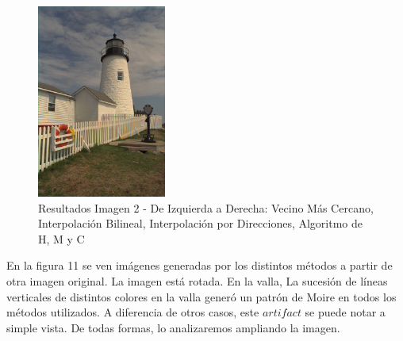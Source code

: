 \documentclass[a4paper]{article}
\begin{document}
\begin{figure}[h!]
\includegraphics[width=120pt]{img/img8-3.png}
\caption{Resultados Imagen 2 - De Izquierda a Derecha: Vecino Más Cercano, Interpolación Bilineal, Interpolación por Direcciones,  Algoritmo de H, M y C}
\end{figure}

En la figura 11 se ven imágenes generadas por los distintos métodos a partir de otra imagen original. La imagen está rotada. En la valla, La sucesión de líneas verticales de distintos colores en la valla generó un patrón de Moire en todos los métodos utilizados. A diferencia de otros casos, este $artifact$ se puede notar a simple vista. De todas formas, lo analizaremos ampliando la imagen.
\end{document}

